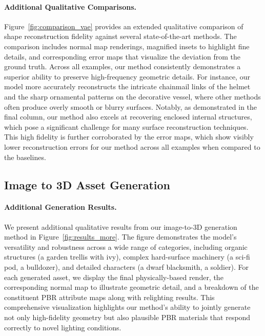 \documentclass[10pt,twocolumn,letterpaper]{article}
\newcommand{\paravspace}{\vspace{-11pt}}
\begin{document}
\paragraph{Additional Qualitative Comparisons.}
Figure~\ref{fig:comparison_vae} provides an extended qualitative comparison of shape reconstruction fidelity against several state-of-the-art methods. The comparison includes normal map renderings, magnified insets to highlight fine details, and corresponding error maps that visualize the deviation from the ground truth. Across all examples, our method consistently demonstrates a superior ability to preserve high-frequency geometric details. For instance, our model more accurately reconstructs the intricate chainmail links of the helmet and the sharp ornamental patterns on the decorative vessel, where other methods often produce overly smooth or blurry surfaces. Notably, as demonstrated in the final column, our method also excels at recovering enclosed internal structures, which pose a significant challenge for many surface reconstruction techniques. This high fidelity is further corroborated by the error maps, which show visibly lower reconstruction errors for our method across all examples when compared to the baselines.

\subsection{Image to 3D Asset Generation}

\paragraph{Additional Generation Results.}
We present additional qualitative results from our image-to-3D generation method in Figure~\ref{fig:results_more}. The figure demonstrates the model's versatility and robustness across a wide range of categories, including organic structures (a garden trellis with ivy), complex hard-surface machinery (a sci-fi pod, a bulldozer), and detailed characters (a dwarf blacksmith, a soldier). For each generated asset, we display the final physically-based render, the corresponding normal map to illustrate geometric detail, and a breakdown of the constituent PBR attribute maps along with relighting results. This comprehensive visualization highlights our method's ability to jointly generate not only high-fidelity geometry but also plausible PBR materials that respond correctly to novel lighting conditions.

\paravspace
\end{document}
